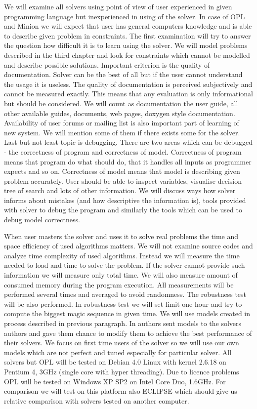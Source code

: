 We will examine all solvers using point of view of user experienced in given programming language but inexperienced in using of the solver. In case of OPL and Minion we will expect that user has general computers knowledge and is able to describe given problem in constraints. The first examination will try to answer the question how difficult it is to learn using the solver. We will model problems described in the third chapter and look for constraints which cannot be modelled and describe possible solutions.  Important criterion is the quality of documentation. Solver can be the best of all but if the user cannot understand the usage it is useless. The quality of documentation is perceived subjectively and cannot be measured exactly. This means that any evaluation is only informational but should be considered. We will count as documentation the user guide, all other available guides, documents, web pages, doxygen style documentation. Availability of user forums or mailing list is also important part of learning of new system. We will mention some of them if there exists some for the solver. Last but not least topic is debugging. There are two areas which can be debugged - the correctness of program and correctness of model. Correctness of program means that program do what should do, that it handles all inputs as programmer expects and so on. Correctness of model means that model is describing given problem accurately. User should be able to inspect variables, visualise decision tree of search and lots of other information. We will discuss ways how solver informs about mistakes (and how descriptive the information is), tools provided with solver to debug the program and similarly the tools which can be used to debug model correctness.

When user masters the solver and uses it to solve real problems the time and space efficiency of used algorithms matters. We will not examine source codes and analyze time complexity of used algorithms. Instead we will measure the time needed to load and time to solve the problem. If the solver cannot provide such information we will measure only total time. We will also measure amount of consumed memory during the program execution. All measurements will be performed several times and averaged to avoid randomness. The robustness test will be also performed. In robustness test we will set limit one hour and try to compute the biggest magic sequence in given time. We will use models created in process described in previous paragraph. In \cite{fernandez00} authors sent models to the solvers authors and gave them chance to modify them to achieve the best performance of their solvers. We focus on first time users of the solver so we will use our own models which are not perfect and tuned especially for particular solver. All solvers but OPL will be tested on Debian 4.0  Linux with kernel 2.6.18 on Pentium 4, 3GHz (single core with hyper threading). Due to licence problems OPL will be tested on Windows XP SP2 on Intel Core Duo, 1.6GHz. For comparison we will test on this platform also ECLIPSE which should give us relative comparison with solvers tested on another computer.

